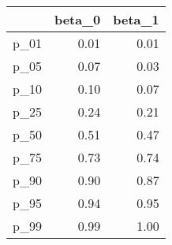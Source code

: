 \begin{table}[ht]
\centering
\begin{tabular}{rrr}
  \hline
 & beta\_0 & beta\_1 \\ 
  \hline
p\_01 & 0.01 & 0.01 \\ 
  p\_05 & 0.07 & 0.03 \\ 
  p\_10 & 0.10 & 0.07 \\ 
  p\_25 & 0.24 & 0.21 \\ 
  p\_50 & 0.51 & 0.47 \\ 
  p\_75 & 0.73 & 0.74 \\ 
  p\_90 & 0.90 & 0.87 \\ 
  p\_95 & 0.94 & 0.95 \\ 
  p\_99 & 0.99 & 1.00 \\ 
   \hline
\end{tabular}
\end{table}
